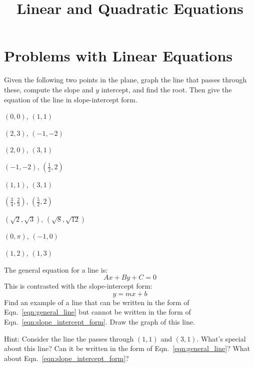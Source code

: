 \documentclass[crop=false,class=article,oneside]{standalone}
\begin{document}
    \title{Linear and Quadratic Equations}
    \author{\vspace{-5ex}}
    \date{\vspace{-5ex}}
    \maketitle
    \section{Problems with Linear Equations}
        \begin{problem}
            Given the following two points in the plane,
            graph the line that passes through these, compute
            the slope and $y$ intercept, and find the root.
            Then give the equation of the line in slope-intercept
            form.
            \begin{enumerate}
                \begin{multicols}{3}
                    \item $(0,0)$, $(1,1)$
                    \item $(2,3)$, $(\minus{1},\minus{2})$
                    \item $(2,0)$, $(3,1)$
                    \item $(\minus{1},\minus{2})$, $(\frac{1}{2},2)$
                    \item $(1,1)$, $(3,1)$
                    \item $(\frac{3}{4},\frac{2}{3})$,
                          $(\frac{5}{2},2)$
                    \item $(\sqrt{2},\sqrt{3})$,
                          $(\sqrt{8},\sqrt{12})$
                    \item $(0,\pi)$, $(\minus{1},0)$
                    \item $(1,2)$, $(1,3)$
                \end{multicols}
            \end{enumerate}
        \end{problem}
        \newpage
        \begin{problem}
            The general equation for a line is:
            \begin{equation}
                \label{eqn:general_line}%
                Ax+By+C=0
            \end{equation}
            This is contrasted with the slope-intercept form:
            \begin{equation}
                \label{eqn:slope_intercept_form}%
                y=mx+b
            \end{equation}
            Find an example of a line that can be written
            in the form of Eqn.~\ref{eqn:general_line} but
            cannot be written in the form of
            Eqn.~\ref{eqn:slope_intercept_form}. Draw the graph of
            this line.
            \par
            Hint: Consider the line the passes through
            $(1,1)$ and $(3,1)$. What's special about this line?
            Can it be written in the form of
            Eqn.~\ref{eqn:general_line}? What about
            Eqn.~\ref{eqn:slope_intercept_form}?
        \end{problem}
\end{document}
